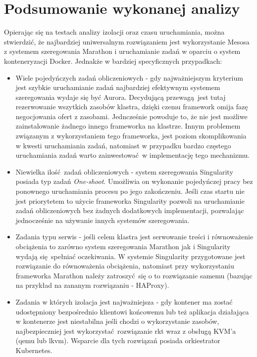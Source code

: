 \documentclass[10pt,a4paper,titlepage,twoside]{report}
\begin{document}
\onehalfspacing
\chapter{Podsumowanie wykonanej analizy}
Opierając się na testach analizy izolacji oraz czasu uruchamiania, można stwierdzić, że najbardziej uniwersalnym rozwiązaniem jest wykorzystanie Mesosa z systemem szeregowania Marathon i uruchamianie zadań w oparciu o system konteneryzacji Docker. Jednakże w bardziej specyficznych przypadkach: 
\begin{itemize}
\item Wiele pojedyńczych zadań obliczeniowych - gdy najważniejszym kryterium jest szybkie uruchamianie zadań najbardziej efektywnym systemem szeregowania wydaje się być Aurora. Decydującą przewagą jest tutaj rezerwowanie wszytkich zasobów klastra, dzięki czemu framework omija fazę negocjowania ofert z zasobami. Jedncześnie powoduje to, że nie jest możliwe zainstalowanie żadnego innego frameworka na klastrze. Innym problemem związanym z wykorzystaniem tego frameworka, jest poziom skomplikowania w kwesti uruchamiania zadań, natomiast w przypadku bardzo częstego uruchamiania zadań warto zainwestować w implementację tego mechanizmu.
\item Niewielka ilość zadań obliczeniowych - system szeregowania Singularity posiada typ zadań \textit{One-shoot}. Umożliwia on wykonanie pojedyńczej pracy bez ponownego uruchamiania procesu po jego zakończeniu. Jeśli czas startu nie jest priorytetem to użycie frameworka Singularity pozwoli na uruchamianie zadań obliczeniowych bez żadnych dodatkowych implementacji, pozwalając jednocześnie na używanie innych systemów szeregowania. 
\item Zadania typu serwis - jeśli celem klastra jest serwowanie treści i równoważenie obciążenia to zarówno system szeregowania Marathon jak i Singularity wydają się spełniać oczekiwania. W systemie Singularity przygotowane jest rozwiązanie do równoważenia obciążenia, natomiast przy wykorzystaniu frameworka Marathon należy zatroszyć się o to rozwiązanie samemu (bazując na przykład na zananym rozwiązaniu - HAProxy).
\item Zadania w których izolacja jest najważniejsza - gdy kontener ma zostać udostępniony bezpośrednio klientowi końcowemu lub też aplikacja działająca w kontenerze jest niestabilna jeśli chodzi o wykorzystanie zasobów, najbezpieczniej jest wykorzystać rozwiązanie rkt wraz z obsługą KVM'a (qemu lub lkvm). Wsparcie dla tych rozwiązań posiada orkiestrator Kubernetes.
\end{itemize}
\end{document}
